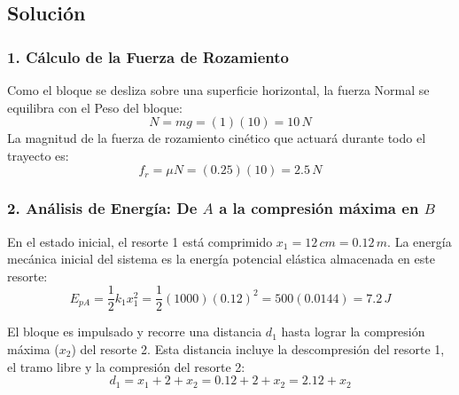 \documentclass[12pt, a4paper]{article}
\begin{document}
\begin{center}
\end{center}

\subsection*{Solución}

\subsubsection*{1. Cálculo de la Fuerza de Rozamiento}
Como el bloque se desliza sobre una superficie horizontal, la fuerza Normal se equilibra con el Peso del bloque:
$$ N = mg = (1)(10) = 10 \, \si{N} $$
La magnitud de la fuerza de rozamiento cinético que actuará durante todo el trayecto es:
$$ f_r = \mu N = (0.25)(10) = 2.5 \, \si{N} $$

\subsubsection*{2. Análisis de Energía: De $A$ a la compresión máxima en $B$}
En el estado inicial, el resorte 1 está comprimido $x_1 = 12 \, \si{cm} = 0.12 \, \si{m}$. La energía mecánica inicial del sistema es la energía potencial elástica almacenada en este resorte:
$$ E_{pA} = \frac{1}{2} k_1 x_1^2 = \frac{1}{2} (1000) (0.12)^2 = 500 (0.0144) = 7.2 \, \si{J} $$

El bloque es impulsado y recorre una distancia $d_1$ hasta lograr la compresión máxima ($x_2$) del resorte 2. Esta distancia incluye la descompresión del resorte 1, el tramo libre y la compresión del resorte 2:
$$ d_1 = x_1 + 2 + x_2 = 0.12 + 2 + x_2 = 2.12 + x_2 $$
\end{document}
